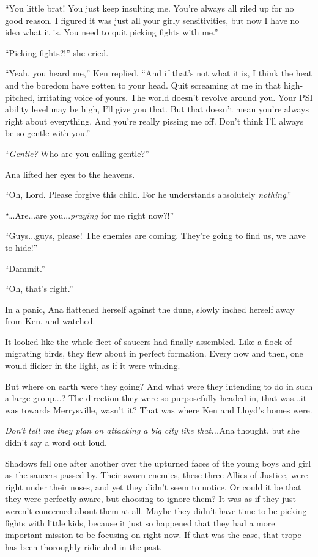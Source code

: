 \documentclass[
]{article}
\begin{document}
``You little brat! You just keep insulting me. You're always all riled
up for no good reason. I figured it was just all your girly
sensitivities, but now I have no idea what it is. You need to quit
picking fights with me.''

``Picking fights?!'' she cried.

``Yeah, you heard me,'' Ken replied. ``And if that's not what it is, I
think the heat and the boredom have gotten to your head. Quit screaming
at me in that high-pitched, irritating voice of yours. The world doesn't
revolve around you. Your PSI ability level may be high, I'll give you
that. But that doesn't mean you're always right about everything. And
you're really pissing me off. Don't think I'll always be so gentle with
you.''

``\emph{Gentle?} Who are you calling gentle?''

Ana lifted her eyes to the heavens.

``Oh, Lord. Please forgive this child. For he understands absolutely
\emph{nothing}.''

``...Are...are you...\emph{praying} for me right now?!''

``Guys...guys, please! The enemies are coming. They're going to find us,
we have to hide!''

``Dammit.''

``Oh, that's right.''

In a panic, Ana flattened herself against the dune, slowly inched
herself away from Ken, and watched.

It looked like the whole fleet of saucers had finally assembled. Like a
flock of migrating birds, they flew about in perfect formation. Every
now and then, one would flicker in the light, as if it were winking.

But where on earth were they going? And what were they intending to do
in such a large group...? The direction they were so purposefully headed
in, that was...it was towards Merrysville, wasn't it? That was where Ken
and Lloyd's homes were.

\emph{Don't tell me they plan on attacking a big city like that...}Ana
thought, but she didn't say a word out loud.

Shadows fell one after another over the upturned faces of the young boys
and girl as the saucers passed by. Their sworn enemies, these three
Allies of Justice, were right under their noses, and yet they didn't
seem to notice. Or could it be that they were perfectly aware, but
choosing to ignore them? It was as if they just weren't concerned about
them at all. Maybe they didn't have time to be picking fights with
little kids, because it just so happened that they had a more important
mission to be focusing on right now. If that was the case, that trope
has been thoroughly ridiculed in the past.
\end{document}
